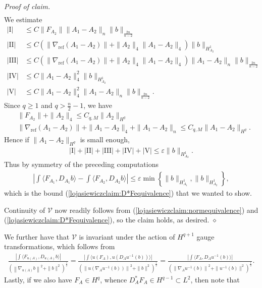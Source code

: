 \documentclass[12pt]{amsart}
\renewcommand{\1}{{\mathbf 1}}
\newenvironment{claimproof}{\par\noindent\textit{Proof of claim.}\space}{\hfill$\diamond$\medskip\par}
\theoremstyle{others}
\numberwithin{equation}{section}
\begin{document}
\begin{claimproof}
\begin{align*}
\end{align*} We estimate
\begin{align*}
    |\text{I}| &\leq C\|F_{A_2}\|\|A_1 - A_2\|_n\|b\|_{\frac{2n}{n-2}} \\
    |\text{II}| &\leq C(\|\nabla_{\text{ref}}(A_1 - A_2)\| + \|A_2\|_4\|A_1 - A_2\|_4)\|b\|_{H_{A_2}^1} \\
    |\text{III}| &\leq C(\|\nabla_{\text{ref}}(A_1 - A_2)\| + \|A_2\|_4\|A_1 - A_2\|_4)\|A_1 -A_2\|_n\|b\|_{\frac{2n}{n-2}} \\
    |\text{IV}| &\leq C\|A_1 - A_2\|_4^2\|b\|_{H_{A_2}^1} \\
    |\text{V}| &\leq C\|A_1 - A_2\|_4^2\|A_1 - A_2\|_n\|b\|_{\frac{2n}{n-2}}.
\end{align*} Since \(q \geq 1\) and \(q > \frac{n}{2}-1\), we have 
\begin{align*}
    &\|F_{A_2}\| + \|A_2\|_4 \leq C_{q, M}\|A_2\|_{H^q} \\
    &\|\nabla_{\text{ref}}(A_1 - A_2)\| + \|A_1 - A_2\|_4 + \|A_1 - A_2\|_n \leq C_{q, M} \|A_1 - A_2\|_{H^q}.
\end{align*}Hence if \(\|A_1 - A_2\|_{H^q}\) is small enough,
\begin{align*}
    |\text{I}| + |\text{II}| + |\text{III}| + |\text{IV}| + |\text{V}| \leq \varepsilon\|b\|_{H_{A_2}^1}.
\end{align*} Thus by symmetry of the preceding computations
\begin{align*}
    \left|\int \langle F_{A_1}, D_{A_1} b\rangle - \int \langle F_{A_2}, D_{A_2} b\rangle\right| \leq \varepsilon\min\left\{\|b\|_{H_{A_1}^1}, \|b\|_{H_{A_2}^1}\right\},
\end{align*} which is the bound (\ref{lojasiewiczclaim:D*Fequivalence}) that we wanted to show. \par
Continuity of \(\mathcal{V}\) now readily follows from (\ref{lojasiewiczclaim:normequivalence}) and (\ref{lojasiewiczclaim:D*Fequivalence}), so the claim holds, as desired.
\end{claimproof}
\par We further have that \(\mathcal{V}\) is invariant under the action of \(H^{q+1}\) gauge transformations, which follows from
\begin{align*}
    \frac{\left|\int \langle F_{u(A)}, D_{u(A)} b\rangle\right|}{\left(\left\|\nabla_{u(A)} b\right\|^2 + \|b\|^2\right)^{\frac{1}{2}}} = \frac{\left|\int \langle u(F_A), u(D_A u^{-1}(b))\rangle\right|}{\left(\left\|u\left(\nabla_A u^{-1}(b)\right)\right\|^2 + \|b\|^2\right)^{\frac{1}{2}}} = \frac{\left|\int \langle F_A, D_A u^{-1}(b)\rangle\right|}{\left(\left\|\nabla_A u^{-1}(b)\right\|^2 + \|u^{-1}(b)\|^2\right)^{\frac{1}{2}}}.
\end{align*} Lastly, if we also have \(F_A \in H^q\), whence \(D_A^\ast F_A \in H^{q-1} \subset L^2\), then note that
\end{document}

